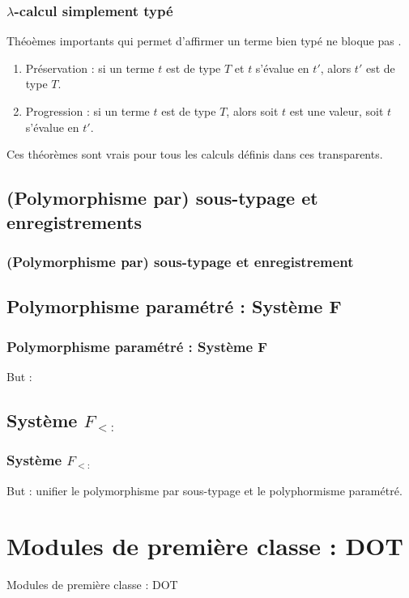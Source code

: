 \documentclass{beamer}
\begin{document}
\begin{frame}
  \frametitle{$\lambda$-calcul simplement typé}
  Théoèmes importants qui permet d'affirmer \og un terme bien typé ne bloque pas \fg.
  \begin{enumerate}
  \item Préservation : si un terme $t$ est de type $T$ et $t$ s'évalue en $t'$,
    alors $t'$ est de type $T$.
  \item Progression : si un terme $t$ est de type $T$, alors soit $t$ est une
    valeur, soit $t$ s'évalue en $t'$.
  \end{enumerate}
  Ces théorèmes sont vrais pour tous les calculs définis dans ces transparents.
\end{frame}

\subsection{(Polymorphisme par) sous-typage et enregistrements}

\begin{frame}
  \frametitle{(Polymorphisme par) sous-typage et enregistrement}
\end{frame}

\subsection{Polymorphisme paramétré : Système F}

\begin{frame}
  \frametitle{Polymorphisme paramétré : Système F}
  But : 
\end{frame}

\subsection{Système $F_{<:}$}

\begin{frame}
  \frametitle{Système $F_{<:}$}
  But : unifier le polymorphisme par sous-typage et le polyphormisme paramétré.
\end{frame}

\section{Modules de première classe : DOT}

\begin{frame}
	\begin{center}
		\Huge{Modules de première classe : DOT}
	\end{center}
\end{frame}
\end{document}
